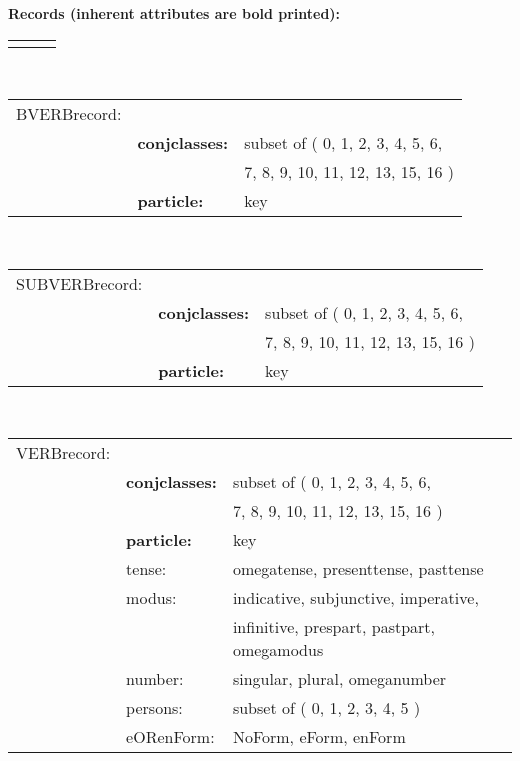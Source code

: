{\bf Records (inherent attributes are bold printed):}
\\
\begin{tabular}{lll}
             &                    &              \\
\end{tabular}
\\
\begin{tabular}{lll}
BVERBrecord: &                    &              \\
             & {\bf conjclasses:} & subset of ( 0, 1, 2, 3, 4, 5, 6,  \\
             &                          & 7, 8, 9, 10, 11, 12, 13, 15, 16 ) \\
             & {\bf particle:}    & key                               \\
\end{tabular}
\\
\begin{tabular}{lll}
SUBVERBrecord: &                    &              \\
               & {\bf conjclasses:} & subset of ( 0, 1, 2, 3, 4, 5, 6, \\
               &                        & 7, 8, 9, 10, 11, 12, 13, 15, 16 ) \\
               & {\bf particle:}    & key                               \\
\end{tabular}
\\
\begin{tabular}{lll}
VERBrecord:  &                 &              \\
             & {\bf conjclasses:} & subset of ( 0, 1, 2, 3, 4, 5, 6,  \\
             &                          & 7, 8, 9, 10, 11, 12, 13, 15, 16 ) \\
             & {\bf particle:}    & key                               \\
             & tense:          & omegatense, presenttense, pasttense        \\
             & modus:          & indicative, subjunctive, imperative,       \\ 
             &                 & infinitive, prespart, pastpart, omegamodus \\
             & number:                  & singular, plural, omeganumber     \\
             & persons:                 & subset of ( 0, 1, 2, 3, 4, 5 )    \\
             & eORenForm:               & NoForm, eForm, enForm             \\
\end{tabular}
